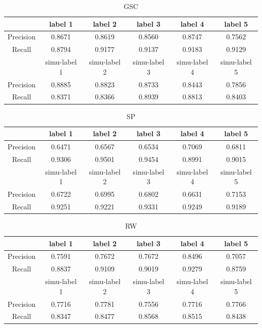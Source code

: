 \documentclass[runningheads,a4paper]{llncs}
\begin{document}
\begin{table}
\centering
\begin{tabular}{|c|c|c|c|c|c|}
\hline
 & label 1 & label 2&label 3&label 4&label 5 \\
  \hline
Precision& 0.8671 & 0.8619 & 0.8560& 0.8747& 0.7562 \\
\hline
Recall& 0.8794 & 0.9177 & 0.9137& 0.9183& 0.9129  \\
\hline
 & simu-label 1 & simu-label 2&simu-label 3&simu-label 4&simu-label 5 \\
\hline
Precision& 0.8885 & 0.8823 & 0.8733& 0.8443& 0.7856 \\
\hline
Recall& 0.8371 & 0.8366 & 0.8939& 0.8813& 0.8403 \\
\hline
\end{tabular}
\caption{GSC}
\label{ta: simu in gsc}
\end{table} 

\begin{table}
\centering
\begin{tabular}{|c|c|c|c|c|c|}
\hline
 & label 1 & label 2&label 3&label 4&label 5 \\
\hline
Precision& 0.6471 & 0.6567 & 0.6534& 0.7069& 0.6811 \\
\hline
Recall& 0.9306 & 0.9501 & 0.9454& 0.8991& 0.9015 \\
\hline
 & simu-label 1 & simu-label 2&simu-label 3&simu-label 4&simu-label 5 \\
\hline
Precision& 0.6722 & 0.6995 & 0.6802& 0.6631& 0.7153 \\
\hline
Recall& 0.9251 & 0.9221 & 0.9331& 0.9249& 0.9189 \\
\hline
\end{tabular}
\caption{SP}
\label{ta: simu in sp}
\end{table} 


\begin{table}
\centering
\begin{tabular}{|c|c|c|c|c|c|}
\hline
 & label 1 & label 2&label 3&label 4&label 5 \\
\hline
Precision& 0.7591 & 0.7672 & 0.7672& 0.8496& 0.7057 \\
\hline
Recall& 0.8837 & 0.9109 & 0.9019& 0.9279& 0.8759 \\
\hline
 & simu-label 1 & simu-label 2&simu-label 3&simu-label 4&simu-label 5 \\
\hline
Precision& 0.7716 & 0.7781 & 0.7556& 0.7716& 0.7766 \\
\hline
Recall& 0.8347 & 0.8477 & 0.8568& 0.8515& 0.8438 \\
\hline
\end{tabular}
\caption{RW}
\label{ta: simu in rw}
\end{table} 
\end{document}
